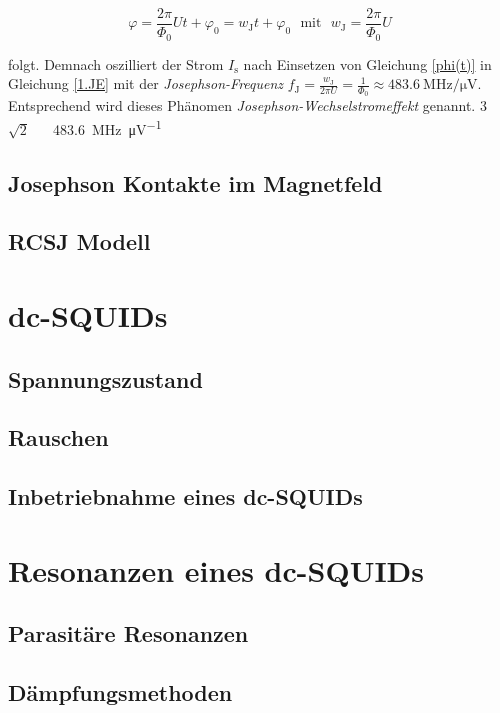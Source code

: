 \begin{equation}
\label{phi(t)}
\varphi = \frac{2\pi}{\Phi_0}Ut + \varphi_0 = w_\mathrm{J}t + \varphi_0 \ \ \  \mathrm{mit} \ \ \ w_\mathrm{J} = \frac{2\pi}{\Phi_0}U
\end{equation}

folgt. Demnach oszilliert der Strom $I_\mathrm{s}$ nach Einsetzen von Gleichung \eqref{phi(t)} in Gleichung \eqref{1.JE} mit der \textit{Josephson-Frequenz} $f_\mathrm{J} = \frac{w_\mathrm{J}}{2\pi U} = \frac{1}{\Phi_0} \approx \SI{483.6}{\MHz\per\uV}$. Entsprechend wird dieses Phänomen  \textit{Josephson-Wechselstromeffekt} genannt. 
\SI{3}{\fq}
\ensuremath{\sqrt{2}}
\text{\ensuremath{\sqrt{\unit{\hertz}}}}
\SI{}{\sqrthz\fq}
\SI{483.6}{\MHz\per\uV}

\subsection{Josephson Kontakte im Magnetfeld}

\Blindtext

\subsection{RCSJ Modell}

\section{dc-SQUIDs}

\blindtext[3]

\subsection{Spannungszustand}

\subsection{Rauschen}

\subsection{Inbetriebnahme eines dc-SQUIDs}


\section{Resonanzen eines dc-SQUIDs}

\subsection{Parasitäre Resonanzen}

\subsection{Dämpfungsmethoden}



